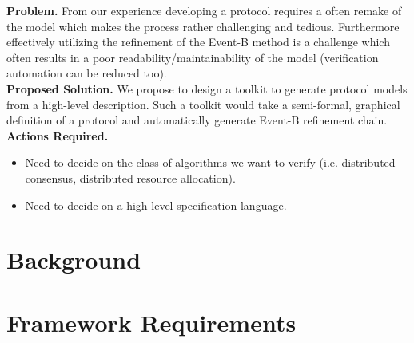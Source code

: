 \documentclass{llncs}
\begin{document}
	

	
	\noindent \textbf{Problem.} From our experience developing a protocol requires a often remake of the model which makes the process rather challenging and tedious. Furthermore effectively utilizing the refinement of the Event-B method is a challenge which often results in a poor readability/maintainability of the model (verification automation can be reduced too).\\
	
	\noindent \textbf{Proposed Solution.} We propose to design a toolkit to generate protocol models from a high-level
	description. Such a toolkit would take a semi-formal, graphical definition of a protocol and automatically generate Event-B refinement chain.\\
	
	\noindent \textbf{Actions Required.}
	
	\begin{itemize}
		\item Need to decide on the class of algorithms we want to verify (i.e. distributed-consensus, distributed resource allocation).  
		\item Need to decide on a high-level specification language.

	\end{itemize}
	\section{Background}
	

		\section{Framework Requirements}
		
\end{document}
